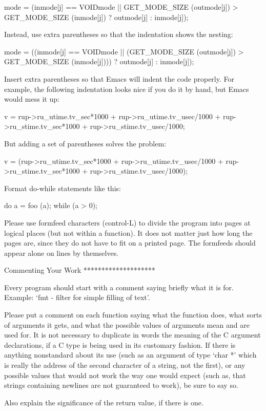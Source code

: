      mode = (inmode[j] == VOIDmode
             || GET_MODE_SIZE (outmode[j]) > GET_MODE_SIZE (inmode[j])
             ? outmode[j] : inmode[j]);

   Instead, use extra parentheses so that the indentation shows the
nesting:

     mode = ((inmode[j] == VOIDmode
              || (GET_MODE_SIZE (outmode[j]) > GET_MODE_SIZE (inmode[j])))
             ? outmode[j] : inmode[j]);

   Insert extra parentheses so that Emacs will indent the code properly.
For example, the following indentation looks nice if you do it by hand,
but Emacs would mess it up:

     v = rup->ru_utime.tv_sec*1000 + rup->ru_utime.tv_usec/1000
         + rup->ru_stime.tv_sec*1000 + rup->ru_stime.tv_usec/1000;

   But adding a set of parentheses solves the problem:

     v = (rup->ru_utime.tv_sec*1000 + rup->ru_utime.tv_usec/1000
          + rup->ru_stime.tv_sec*1000 + rup->ru_stime.tv_usec/1000);

   Format do-while statements like this:

     do
       {
         a = foo (a);
       }
     while (a > 0);

   Please use formfeed characters (control-L) to divide the program into
pages at logical places (but not within a function).  It does not matter
just how long the pages are, since they do not have to fit on a printed
page.  The formfeeds should appear alone on lines by themselves.

Commenting Your Work
********************

   Every program should start with a comment saying briefly what it is
for.  Example: `fmt - filter for simple filling of text'.

   Please put a comment on each function saying what the function does,
what sorts of arguments it gets, and what the possible values of
arguments mean and are used for.  It is not necessary to duplicate in
words the meaning of the C argument declarations, if a C type is being
used in its customary fashion.  If there is anything nonstandard about
its use (such as an argument of type `char *' which is really the
address of the second character of a string, not the first), or any
possible values that would not work the way one would expect (such as,
that strings containing newlines are not guaranteed to work), be sure
to say so.

   Also explain the significance of the return value, if there is one.

